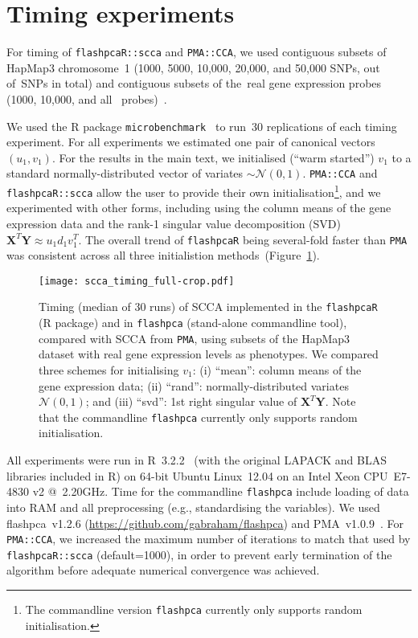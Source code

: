 \documentclass[a4paper,10pt]{article}
\begin{document}
\section{Timing experiments}

For timing of \texttt{flashpcaR::scca} and \texttt{PMA::CCA}, we used
contiguous subsets of HapMap3 chromosome~1 (1000, 5000, 10,000, 20,000,
and 50,000 SNPs, out of~\nsnpschr SNPs in total) and contiguous subsets
of the~\ngenes real gene expression probes (1000, 10,000, and all~\ngenes
probes)~\citep{Stranger2012}.

We used the \textsf{R} package \texttt{microbenchmark}~\citep{Mersmann2015}
to run~30 replications of each timing experiment.  For all
experiments we estimated one pair of canonical vectors $(u_1,
v_1)$.  For the results in the main text, we initialised (``warm
started'') $v_1$ to a standard normally-distributed vector of variates
$\sim\mathcal{N}(0,1)$. \texttt{PMA::CCA} and \texttt{flashpcaR::scca}
allow the user to provide their own initialisation\footnote{The commandline
version \texttt{flashpca} currently only supports random initialisation.},
and we experimented with other forms, including using the column means
of the gene expression data and the rank-1 singular value decomposition
(SVD) $\mathbf{X}^T \mathbf{Y} \approx u_1 d_1 v_1^T$. The overall trend of
\texttt{flashpcaR} being several-fold faster than \texttt{PMA} was consistent
across all three initialistion methods~(Figure~\ref{fig:s01}).

\begin{figure}[!tpb]
\centering
\texttt{[image: scca\_timing\_full-crop.pdf]}
\caption{
Timing (median of 30 runs) of SCCA implemented in the \texttt{flashpcaR}
(\textsf{R} package) and in \texttt{flashpca} (stand-alone commandline tool),
compared with SCCA from \texttt{PMA}, using subsets of the HapMap3 dataset with real
gene expression levels as phenotypes. We compared three schemes for initialising
$v_1$: (i) ``mean'': column means of the gene expression data; (ii) ``rand'':
normally-distributed variates $\mathcal{N}(0, 1)$; and (iii) ``svd'': 1st
right singular value of $\mathbf{X}^T \mathbf{Y}$. Note that the commandline
\texttt{flashpca} currently only supports random initialisation.
}
\label{fig:s01}
\end{figure}

All experiments were run in \textsf{R}~3.2.2~\citep{R} (with the original
LAPACK and BLAS libraries included in \textsf{R}) on 64-bit Ubuntu
Linux~12.04 on an Intel Xeon CPU~E7-4830 v2 @~2.20GHz. Time for the
commandline \texttt{flashpca} include loading of data into RAM and all
preprocessing (e.g., standardising the variables). We used flashpca~v1.2.6
(\url{https://github.com/gabraham/flashpca}) and PMA~v1.0.9~\citep{Witten2013}.
For \texttt{PMA::CCA}, we increased the maximum number of iterations to match
that used by \texttt{flashpcaR::scca} (default=1000), in order to prevent
early termination of the algorithm before adequate numerical convergence
was achieved.
\end{document}
